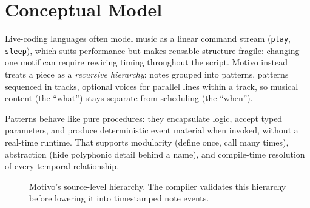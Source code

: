 \section{Conceptual Model}\label{sec:conceptual-model}

Live-coding languages often model music as a linear command stream (\texttt{play}, \texttt{sleep}), which suits
performance but makes reusable structure fragile: changing one motif can require rewiring timing throughout the
script.
Motivo instead treats a piece as a \textit{recursive hierarchy}: notes grouped into patterns, patterns sequenced in
tracks, optional voices for parallel lines within a track, so musical content (the ``what'') stays separate from
scheduling (the ``when'').

Patterns behave like pure procedures: they encapsulate logic, accept typed parameters, and produce deterministic
event material when invoked, without a real-time runtime.
That supports modularity (define once, call many times), abstraction (hide polyphonic detail behind a name), and
compile-time resolution of every temporal relationship.

\begin{figure}[htbp]
  \centering
  \caption{Motivo's source-level hierarchy.
  The compiler validates this hierarchy before lowering it into timestamped note events.}\label{fig:motivo-hierarchy}
\end{figure}
